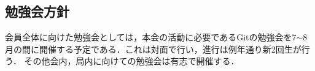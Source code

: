 \subsection*{勉強会方針}


会員全体に向けた勉強会としては，本会の活動に必要であるGitの勉強会を7$\sim$8月の間に開催する予定である．これは対面で行い，進行は例年通り新2回生が行う．
その他会内，局内に向けての勉強会は有志で開催する．
